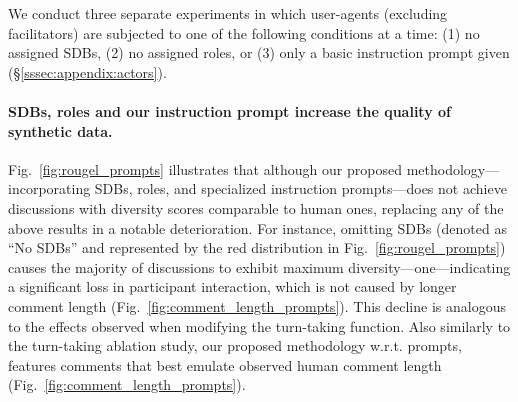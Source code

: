 We conduct three separate experiments in which user-agents (excluding facilitators) are subjected to one of the following conditions at a time: (1) no assigned \acp{SDB}, (2) no assigned roles, or (3) only a basic instruction prompt given (\S\ref{sssec:appendix:actors}). 

\paragraph{\acp{SDB}, roles and our instruction prompt increase the quality of synthetic data.} Fig.~\ref{fig:rougel_prompts} illustrates that although our proposed methodology---incorporating \acp{SDB}, roles, and specialized instruction prompts---does not achieve discussions with diversity scores comparable to human ones, replacing any of the above results in a notable deterioration. For instance, omitting \acp{SDB} (denoted as ``No \acp{SDB}'' and represented by the red distribution in Fig.~\ref{fig:rougel_prompts}) causes the majority of discussions to exhibit maximum diversity---one---indicating a significant loss in participant interaction, which is not caused by longer comment length (Fig.~\ref{fig:comment_length_prompts}). This decline is analogous to the effects observed when modifying the turn-taking function. Also similarly to the turn-taking ablation study, our proposed methodology w.r.t. prompts, features comments that best emulate observed human comment length (Fig.~\ref{fig:comment_length_prompts}).